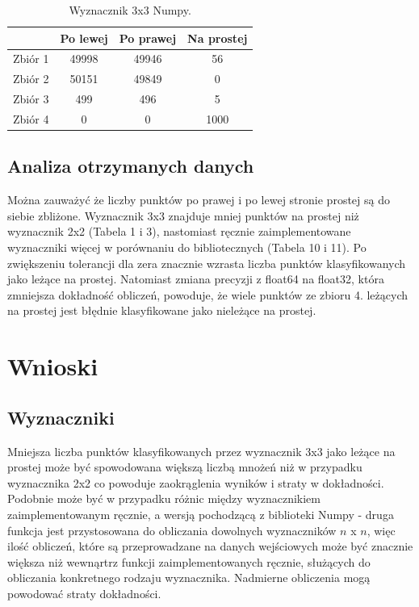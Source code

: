 \documentclass[11pt]{scrartcl}
\begin{document}
    \begin{table}[H]
        \centering
        \renewcommand{\arraystretch}{1.5}
        \begin{tabular}{| c | c | c | c |}
            \hline
            & Po lewej & Po prawej & Na prostej \\
            \hline
            Zbiór 1 & 49998 & 49946 & 56 \\
            \hline
            Zbiór 2 & 50151 & 49849 & 0 \\
            \hline
            Zbiór 3 & 499 & 496 & 5 \\
            \hline
            Zbiór 4 & 0 & 0 & 1000 \\
            \hline
        \end{tabular}
        \renewcommand{\arraystretch}{1.5}
        \caption{Wyznacznik 3x3 Numpy.}
    \end{table}

    \subsection{Analiza otrzymanych danych}
    Można zauważyć że liczby punktów po prawej i po lewej stronie prostej są
    do siebie zbliżone. Wyznacznik 3x3 znajduje mniej punktów na prostej
    niż wyznacznik 2x2 (Tabela 1 i 3), nastomiast ręcznie zaimplementowane
    wyznaczniki więcej w porównaniu do bibliotecznych (Tabela 10 i 11). Po zwiększeniu tolerancji
    dla zera znacznie wzrasta liczba punktów klasyfikowanych jako leżące na
    prostej. Natomiast zmiana precyzji z float64 na float32, która zmniejsza
    dokładność obliczeń, powoduje, że wiele punktów ze zbioru 4. leżących na
    prostej jest błędnie klasyfikowane jako nieleżące na prostej.

    \section{Wnioski}
    \subsection*{Wyznaczniki}
    Mniejsza liczba punktów klasyfikowanych przez wyznacznik 3x3 jako leżące
    na prostej może być spowodowana większą liczbą mnożeń niż w przypadku
    wyznacznika 2x2 co powoduje zaokrąglenia wyników i straty w dokładności.
    Podobnie może być w przypadku różnic między wyznacznikiem zaimplementowanym
    ręcznie, a wersją pochodzącą z biblioteki Numpy - druga funkcja jest
    przystosowana do obliczania dowolnych wyznaczników $n$ x $n$, więc ilość
    obliczeń, które są przeprowadzane na danych wejściowych może być znacznie
    większa niż wewnąrtrz funkcji zaimplementowanych ręcznie, służących do
    obliczania konkretnego rodzaju wyznacznika. Nadmierne obliczenia mogą
    powodować straty dokładności.
\end{document}

